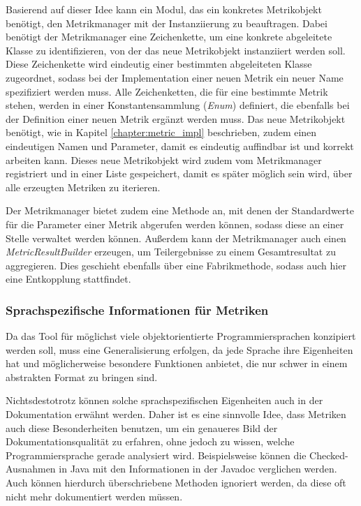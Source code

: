 Basierend auf dieser Idee kann ein Modul, das ein konkretes Metrikobjekt benötigt, den Metrikmanager mit der Instanziierung zu beauftragen. Dabei benötigt der Metrikmanager eine Zeichenkette, um eine konkrete abgeleitete Klasse zu identifizieren, von der das neue Metrikobjekt instanziiert werden soll. Diese Zeichenkette wird eindeutig einer bestimmten abgeleiteten Klasse zugeordnet, sodass bei der Implementation einer neuen Metrik ein neuer Name spezifiziert werden muss. Alle Zeichenketten, die für eine bestimmte Metrik stehen, werden in einer Konstantensammlung  (\textit{Enum}) definiert, die ebenfalls bei der Definition einer neuen Metrik ergänzt werden muss.  Das neue Metrikobjekt benötigt, wie in Kapitel \ref{chapter:metric_impl} beschrieben, zudem einen eindeutigen Namen und Parameter, damit es eindeutig auffindbar ist und korrekt arbeiten kann. Dieses neue Metrikobjekt wird zudem vom Metrikmanager registriert und in einer Liste gespeichert, damit es später möglich sein wird, über alle erzeugten Metriken zu iterieren. 

Der Metrikmanager bietet zudem eine Methode an, mit denen der Standardwerte für die Parameter einer Metrik abgerufen werden können, sodass diese an einer Stelle verwaltet werden können. Außerdem kann der Metrikmanager auch einen \textit{MetricResultBuilder} erzeugen, um Teilergebnisse zu einem Gesamtresultat zu aggregieren. Dies geschieht ebenfalls über eine Fabrikmethode, sodass auch hier eine Entkopplung stattfindet. 

\subsubsection{Sprachspezifische Informationen für Metriken}\label{chapter:langSpec}
Da das Tool für möglichst viele objektorientierte Programmiersprachen konzipiert werden soll, muss eine Generalisierung erfolgen, da jede Sprache ihre Eigenheiten hat und möglicherweise besondere Funktionen anbietet, die nur schwer in einem abstrakten Format zu bringen sind.

Nichtsdestotrotz können solche sprachspezifischen Eigenheiten auch in der Dokumentation erwähnt werden. Daher ist es eine sinnvolle Idee, dass Metriken auch diese Besonderheiten benutzen, um ein genaueres Bild der Dokumentationsqualität zu erfahren, ohne jedoch zu wissen, welche Programmiersprache gerade analysiert wird. Beispielsweise können die Checked-Ausnahmen in Java mit den Informationen in der Javadoc verglichen werden. Auch können hierdurch überschriebene Methoden ignoriert werden, da diese oft nicht mehr dokumentiert werden müssen.

